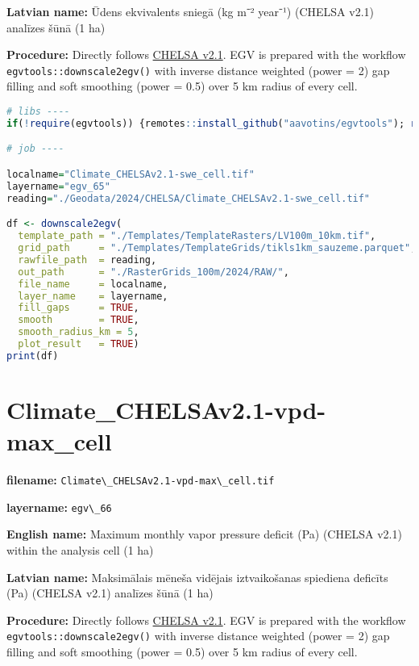 \documentclass[
]{book}
\newcommand{\passthrough}[1]{#1}
\begin{document}
\textbf{Latvian name:} Ūdens ekvivalents sniegā (kg m⁻² year⁻¹) (CHELSA v2.1) analīzes šūnā (1 ha)

\textbf{Procedure:} Directly follows \hyperref[Ch04.11]{CHELSA v2.1}. EGV is prepared with the
workflow \passthrough{\lstinline!egvtools::downscale2egv()!} with inverse distance weighted (power = 2)
gap filling and soft smoothing (power = 0.5) over 5 km radius of every cell.

\begin{lstlisting}[language=R]
# libs ----
if(!require(egvtools)) {remotes::install_github("aavotins/egvtools"); require(egvtools)}

# job ----

localname="Climate_CHELSAv2.1-swe_cell.tif"
layername="egv_65"
reading="./Geodata/2024/CHELSA/Climate_CHELSAv2.1-swe_cell.tif"

df <- downscale2egv(
  template_path = "./Templates/TemplateRasters/LV100m_10km.tif",
  grid_path     = "./Templates/TemplateGrids/tikls1km_sauzeme.parquet",
  rawfile_path  = reading,
  out_path      = "./RasterGrids_100m/2024/RAW/",
  file_name     = localname,
  layer_name    = layername,
  fill_gaps     = TRUE,
  smooth        = TRUE,
  smooth_radius_km = 5,
  plot_result   = TRUE)
print(df)
\end{lstlisting}

\section{Climate\_CHELSAv2.1-vpd-max\_cell}\label{ch06.066}

\textbf{filename:} \passthrough{\lstinline!Climate\_CHELSAv2.1-vpd-max\_cell.tif!}

\textbf{layername:} \passthrough{\lstinline!egv\_66!}

\textbf{English name:} Maximum monthly vapor pressure deficit (Pa) (CHELSA v2.1) within the analysis cell (1 ha)

\textbf{Latvian name:} Maksimālais mēneša vidējais iztvaikošanas spiediena deficīts (Pa) (CHELSA v2.1) analīzes šūnā (1 ha)

\textbf{Procedure:} Directly follows \hyperref[Ch04.11]{CHELSA v2.1}. EGV is prepared with the
workflow \passthrough{\lstinline!egvtools::downscale2egv()!} with inverse distance weighted (power = 2)
gap filling and soft smoothing (power = 0.5) over 5 km radius of every cell.
\end{document}
